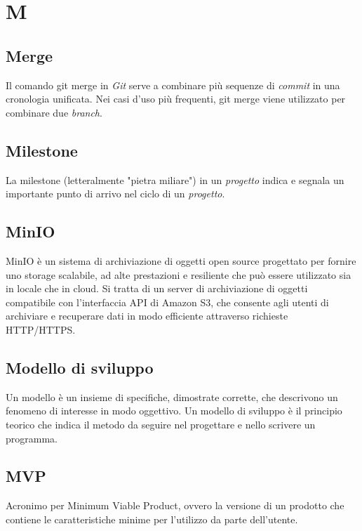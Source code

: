 \chapter{M}

\section{Merge}
Il comando git merge in \emph{Git} serve a combinare più sequenze di \emph{commit} in una cronologia unificata. Nei casi d’uso più frequenti, git merge viene utilizzato per combinare due \emph{branch}.

\section{Milestone}
La milestone (letteralmente "pietra miliare") in un \emph{progetto} indica e segnala un importante punto di arrivo nel ciclo di un \emph{progetto}.

\section{MinIO}
MinIO è un sistema di archiviazione di oggetti open source progettato per fornire uno storage scalabile, ad alte prestazioni e resiliente che può essere utilizzato sia in locale che in cloud. Si tratta di un server di archiviazione di oggetti compatibile con l'interfaccia API di Amazon S3, che consente agli utenti di archiviare e recuperare dati in modo efficiente attraverso richieste HTTP/HTTPS.

\section{Modello di sviluppo}\label{sec:Modelli di sviluppo}
Un modello è un insieme di specifiche, dimostrate corrette, che descrivono un fenomeno di interesse in modo oggettivo. Un modello di sviluppo è il principio teorico che indica il metodo da seguire nel progettare e nello scrivere un programma.

\section{MVP}\label{sec:Minimum Viable Product}
Acronimo per Minimum Viable Product, ovvero la versione di un prodotto che contiene le caratteristiche minime per l'utilizzo da parte dell'utente.
